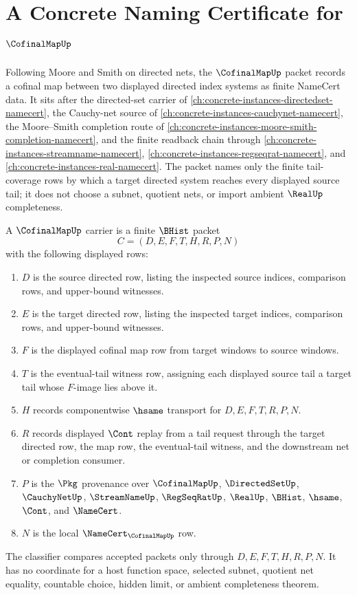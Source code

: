 \chapter{A Concrete Naming Certificate for $\CofinalMapUp$}
\label{ch:concrete-instances-cofinal-map-namecert}

Following Moore and Smith on directed nets, the $\CofinalMapUp$ packet records a cofinal map between two displayed directed index systems as finite NameCert data. It sits after the directed-set carrier of \autoref{ch:concrete-instances-directedset-namecert}, the Cauchy-net source of \autoref{ch:concrete-instances-cauchynet-namecert}, the Moore--Smith completion route of \autoref{ch:concrete-instances-moore-smith-completion-namecert}, and the finite readback chain through \autoref{ch:concrete-instances-streamname-namecert}, \autoref{ch:concrete-instances-regseqrat-namecert}, and \autoref{ch:concrete-instances-real-namecert}. The packet names only the finite tail-coverage rows by which a target directed system reaches every displayed source tail; it does not choose a subnet, quotient nets, or import ambient $\RealUp$ completeness.

\begin{definition}
\label{def:cofinal-map-carrier}
A $\CofinalMapUp$ carrier is a finite $\BHist$ packet
$$
C=(D,E,F,T,H,R,P,N)
$$
with the following displayed rows:
\begin{enumerate}
\item $D$ is the source directed row, listing the inspected source indices, comparison rows, and upper-bound witnesses.
\item $E$ is the target directed row, listing the inspected target indices, comparison rows, and upper-bound witnesses.
\item $F$ is the displayed cofinal map row from target windows to source windows.
\item $T$ is the eventual-tail witness row, assigning each displayed source tail a target tail whose $F$-image lies above it.
\item $H$ records componentwise $\hsame$ transport for $D,E,F,T,R,P,N$.
\item $R$ records displayed $\Cont$ replay from a tail request through the target directed row, the map row, the eventual-tail witness, and the downstream net or completion consumer.
\item $P$ is the $\Pkg$ provenance over $\CofinalMapUp$, $\DirectedSetUp$, $\CauchyNetUp$, $\StreamNameUp$, $\RegSeqRatUp$, $\RealUp$, $\BHist$, $\hsame$, $\Cont$, and $\NameCert$.
\item $N$ is the local $\NameCert_{\CofinalMapUp}$ row.
\end{enumerate}
The classifier compares accepted packets only through $D,E,F,T,H,R,P,N$. It has no coordinate for a host function space, selected subnet, quotient net equality, countable choice, hidden limit, or ambient completeness theorem.
\end{definition}

